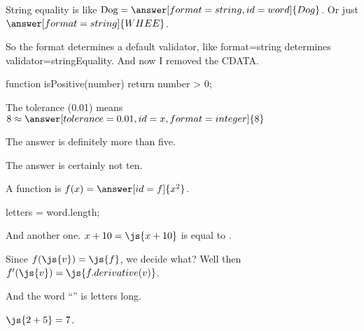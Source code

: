 \documentclass{ximera}
\begin{document}
\begin{problem}
  String equality is like $\mbox{Dog} = \answer[format=string,id=word]{Dog}$.  Or just $\answer[format=string]{WHEE}$.

  So the format determines a default validator, like format=string determines validator=stringEquality.  And now I removed the CDATA.
\end{problem}

\begin{javascript}
  function isPositive(number) {
    return number > 0;
  }
\end{javascript}

\begin{problem}



  The tolerance (0.01) means $8 \approx \answer[tolerance=0.01,id=x,format=integer]{8}$
  
  \begin{feedback}
    The answer is definitely more than five.
  \end{feedback}

  \begin{feedback}[x==10]
    The answer is certainly not ten.
  \end{feedback}

  A function is $f(x) = \answer[id=f]{x^2}$.
\end{problem}

\begin{javascript}
  letters = word.length;
\end{javascript}

And another one.  $x + 10 = \js{x+10}$ is equal to .

Since $f(\js{v}) = \js{f}$, we decide what?  Well then $f'(\js{v}) = \js{f.derivative(v)}$.

And the word ``'' is  letters long.

$\js{2+5} = 7$.
\end{document}
